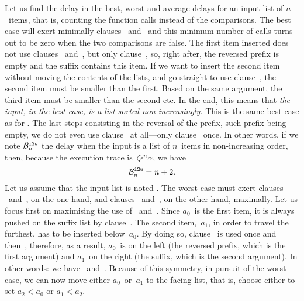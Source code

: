 Let us find the delay in the best, worst and average delays for an
input list of \(n\)~items, that is, counting the function calls
instead of the comparisons. The best case will exert minimally clauses
\clause{\gamma}~and~\clause{\delta} and this minimum number of calls
turns out to be zero when the two comparisons are false. The first
item inserted does not use clauses
\clause{\gamma}~and~\clause{\delta}, but only
clause~\clause{\epsilon}, so, right after, the reversed prefix is
empty and the suffix contains this item. If we want to insert the
second item without moving the contents of the lists, and go straight
to use clause~\clause{\epsilon}, the second item must be smaller than
the first. Based on the same argument, the third item must be smaller
than the second etc. In the end, this means that \emph{the input, in
  the best case, is a list sorted non\hyp{}increasingly.} This is the
same best case as for . The last steps consisting
in the reversal of the prefix, such prefix being empty, we do not even
use clause~\clause{\beta} at all---only clause~\clause{\alpha}
once. In other words, if we note \(\best{i2w}{n}\) the delay when the
input is a list of \(n\)~items in non\hyp{}increasing order, then,
because the execution trace is~\(\zeta\epsilon^n\alpha\), we have
\[
\best{i2w}{n} = n + 2.
\]
Let us assume that the input list is noted
\erlcode{[\(a_0, a_1, \dots, a_{n-1}\)]}. The worst case must
exert clauses \clause{\gamma}~and~\clause{\delta}, on the one hand,
and clauses \clause{\alpha}~and~\clause{\beta}, on the other hand,
maximally. Let us focus first on maximising the use of
\clause{\gamma}~and~\clause{\delta}. Since \(a_0\)~is the first item,
it is always pushed on the suffix list by
clause~\clause{\epsilon}. The second item,~\(a_1\), in order to travel
the furthest, has to be inserted below~\(a_0\). By doing so,
clause~\clause{\gamma} is used once and then~\clause{\epsilon},
therefore, as a result, \(a_0\)~is on the left (the reversed prefix,
which is the first argument) and \(a_1\)~on the right (the suffix,
which is the second argument). In other words: we have
\erlcode{[\(a_0\)]}~and~\erlcode{[\(a_1\)]}. Because of this symmetry,
in pursuit of the worst case, we can now move either
\(a_0\)~or~\(a_1\) to the facing list, that is, choose either to set
\(a_2<a_0\) or \(a_1<a_2\).
